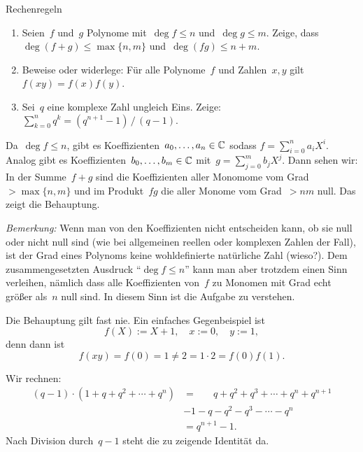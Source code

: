 \documentclass{algblatt}
\begin{document}
\begin{aufgabe}{Rechenregeln}
\begin{enumerate}
\item Seien~$f$ und~$g$ Polynome mit~$\deg f \leq n$ und~$\deg g \leq m$.
Zeige, dass $\deg(f+g) \leq \max\{n,m\}$ und~$\deg(fg) \leq n+m$.
\item Beweise oder widerlege: Für alle Polynome~$f$ und Zahlen~$x,y$ gilt~$f(xy) = f(x) f(y)$.
\item Sei~$q$ eine komplexe Zahl ungleich Eins. Zeige: $\sum_{k=0}^n q^k =
(q^{n+1}-1)\,/\,(q-1).$
\end{enumerate}
\begin{loesungE}
\item Da~$\deg f \leq n$, gibt es Koeffizienten~$a_0,\ldots,a_n \in \mathbb{C}$
sodass $f = \sum_{i=0}^n a_i X^i$. Analog gibt es Koeffizienten~$b_0,\ldots,b_m
\in \mathbb{C}$ mit~$g = \sum_{j=0}^m b_j X^j$. Dann sehen wir: In der Summe~$f+g$
sind die Koeffizienten aller Monomome vom Grad~$> \max\{n,m\}$ und im
Produkt~$fg$ die aller Monome vom Grad~$> nm$ null. Das zeigt die Behauptung.

\emph{Bemerkung:} Wenn man von den Koeffizienten nicht entscheiden kann, ob sie
null oder nicht null sind (wie bei allgemeinen reellen oder komplexen Zahlen
der Fall), ist der Grad eines Polynoms keine wohldefinierte natürliche Zahl
(wieso?). Dem zusammengesetzten Ausdruck "`$\deg f \leq n$"' kann man aber
trotzdem einen Sinn verleihen, nämlich dass alle Koeffizienten von~$f$ zu
Monomen mit Grad echt größer als~$n$ null sind. In diesem Sinn ist die Aufgabe
zu verstehen.

\item Die Behauptung gilt fast nie. Ein einfaches Gegenbeispiel ist
\[ f(X) := X + 1, \quad x := 0, \quad y := 1, \]
denn dann ist
\[ f(xy) = f(0) = 1 \neq 2 = 1 \cdot 2 = f(0) f(1). \]

\item Wir rechnen:
\begin{align*}
  (q-1) \cdot (1 + q + q^2 + \cdots + q^n) &=
    \phantom{1\mathop{-}{}} q + q^2 + q^3 + \cdots + q^n + q^{n+1} \\
  &-1 - q - q^2 - q^3 - \cdots - q^n \\
  &= q^{n+1} - 1.
\end{align*}
Nach Division durch~$q-1$ steht die zu zeigende Identität da.
\end{loesungE}
\end{aufgabe}
\end{document}
